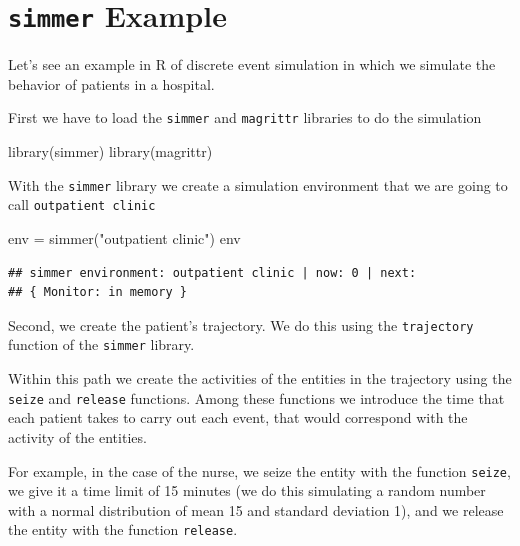 \documentclass[
]{book}
\newenvironment{Shaded}{\begin{snugshade}}{\end{snugshade}}
\newcommand{\FunctionTok}[1]{\textcolor[rgb]{0.00,0.00,0.00}{#1}}
\newcommand{\NormalTok}[1]{#1}
\newcommand{\OtherTok}[1]{\textcolor[rgb]{0.56,0.35,0.01}{#1}}
\newcommand{\StringTok}[1]{\textcolor[rgb]{0.31,0.60,0.02}{#1}}
\begin{document}
\hypertarget{simmer-example}{%
\section{\texorpdfstring{\texttt{simmer} Example}{simmer Example}}\label{simmer-example}}

Let's see an example in R of discrete event simulation in which we simulate the behavior of patients in a hospital.

First we have to load the \texttt{simmer} and \texttt{magrittr} libraries to do the simulation

\begin{Shaded}
\begin{Highlighting}[]
\FunctionTok{library}\NormalTok{(simmer)}
\FunctionTok{library}\NormalTok{(magrittr)}
\end{Highlighting}
\end{Shaded}

With the \texttt{simmer} library we create a simulation environment that we are going to call \texttt{outpatient\ clinic}

\begin{Shaded}
\begin{Highlighting}[]
\NormalTok{env }\OtherTok{=} \FunctionTok{simmer}\NormalTok{(}\StringTok{"outpatient clinic"}\NormalTok{)}
\NormalTok{env}
\end{Highlighting}
\end{Shaded}

\begin{verbatim}
## simmer environment: outpatient clinic | now: 0 | next: 
## { Monitor: in memory }
\end{verbatim}

Second, we create the patient's trajectory. We do this using the \texttt{trajectory} function of the \texttt{simmer} library.

Within this path we create the activities of the entities in the trajectory using the \texttt{seize} and \texttt{release} functions. Among these functions we introduce the time that each patient takes to carry out each event, that would correspond with the activity of the entities.

For example, in the case of the nurse, we seize the entity with the function \texttt{seize}, we give it a time limit of 15 minutes (we do this simulating a random number with a normal distribution of mean 15 and standard deviation 1), and we release the entity with the function \texttt{release}.
\end{document}
